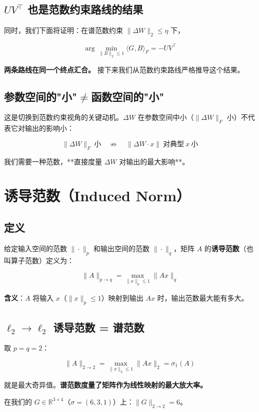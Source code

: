 \documentclass[12pt,a4paper]{article}
\begin{document}
\subsection{$UV^\top$ 也是范数约束路线的结果}

同时，我们下面将证明：在谱范数约束 $\|\Delta W\|_2 \le \eta$ 下，


\[\arg\min_{\|B\|_2 \le 1} \langle G, B \rangle_F = -UV^\top\]

\textbf{两条路线在同一个终点汇合。} 接下来我们从范数约束路线严格推导这个结果。


\subsection{参数空间的"小"$\neq$函数空间的"小"}

这是切换到范数约束视角的关键动机。$\Delta W$ 在参数空间中小（$\|\Delta W\|_F$ 小）不代表它对输出的影响小：


\[\|\Delta W\|_F\ \text{小} \quad \not\Rightarrow \quad \|\Delta W \cdot x\|\ \text{对典型}\ x\ \text{小}\]

我们需要一种范数，**直接度量 $\Delta W$ 对输出的最大影响**。


\section{诱导范数（Induced Norm）}


\subsection{定义}

给定输入空间的范数 $\|\cdot\|_p$ 和输出空间的范数 $\|\cdot\|_q$，矩阵 $A$ 的\textbf{诱导范数}（也叫算子范数）定义为：


\[\|A\|_{p \to q} = \max_{\|x\|_p \le 1} \|Ax\|_q\]

\textbf{含义}：$A$ 将输入 $x$（$\|x\|_p \le 1$）映射到输出 $Ax$ 时，输出范数最大能有多大。


\subsection{$\ell_2 \to \ell_2$ 诱导范数 = 谱范数}

取 $p = q = 2$：


\[\|A\|_{2 \to 2} = \max_{\|x\|_2 \le 1} \|Ax\|_2 = \sigma_1(A)\]

就是最大奇异值。\textbf{谱范数度量了矩阵作为线性映射的最大放大率。}

在我们的 $G \in \mathbb{R}^{3 \times 4}$（$\sigma = (6,3,1)$）上：$\|G\|_{2 \to 2} = 6$。
\end{document}
